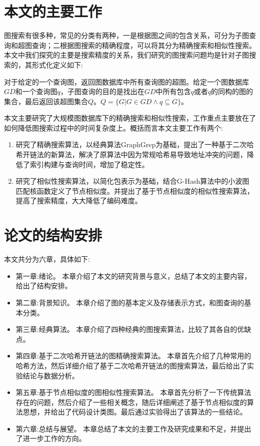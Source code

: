 \documentclass{XDBAthesis}
\begin{document}
\section{本文的主要工作}
图搜索有很多种，常见的分类有两种，一是根据图之间的包含关系，可分为子图查询和超图查询；二根据图搜索的精确程度，可以将其分为精确搜索和相似性搜索。本文中我们探究的主要是搜索精度的关系，我们研究的图搜索问题均是针对子图搜索的，其形式化定义如下:
\begin{defn}
    对于给定的一个查询图，返回图数据库中所有查询图的超图。给定一个图数据库$GD$和一个查询图$q$，子图查询的目的是找出在$GD$中所有包含$q$或者$q$的同构的图的集合，最后返回该超图集合$Q$。$Q=\{G|G\in GD\wedge q\subseteq G\}$。
\end{defn}
本文主要研究了大规模图数据库下的精确搜索和相似性搜索，工作重点主要放在了如何降低图搜索过程中的时间复杂度上。概括而言本文主要工作有两个:
\begin{enumerate}
    \item 研究了精确搜索算法，以经典算法GraphGrep\cite{graphgrep}为基础，提出了一种基于二次哈希开链法的新算法，解决了原算法中因为常规哈希易导致地址冲突的问题，降低了索引构建与查询时间，增加了稳定性。
    \item 研究了相似性搜索算法，以简化包表示为基础，结合G-Hash\cite{ghash}算法中的小波图匹配核函数定义了节点相似度。并提出了基于节点相似度的相似性搜索算法，提高了搜索精度，大大降低了编码难度。
\end{enumerate}
\section{论文的结构安排}
本文共分为六章，具体如下:
\begin{itemize}
    \item 第一章:绪论。 本章介绍了本文的研究背景与意义，总结了本文的主要内容，给出了结构安排。
    \item 第二章:背景知识。 本章介绍了图的基本定义及存储表示方式，和图查询的基本分类。
    \item 第三章:经典算法。 本章介绍了四种经典的图搜索算法，比较了其各自的优缺点。
    \item 第四章:基于二次哈希开链法的图精确搜索算法。 本章首先介绍了几种常用的哈希方法，然后详细介绍了基于二次哈希开链法的图搜索算法，最后给出了实验结论与数据分析。
    \item 第五章:基于节点相似度的图相似性搜索算法。 本章首先分析了一下传统算法存在的问题，然后介绍了一些相关概念，随后详细阐述了基于节点相似度的算法思想，并给出了代码设计类图。最后通过实验得出了该算法的一些结论。
    \item 第六章:总结与展望。 本章总结了本文的主要工作及研究成果和不足，并提出了进一步工作的方向。
\end{itemize}



\ifx\allfiles\undefined
\renewcommand\refname{参考文献}
%

\end{document}
